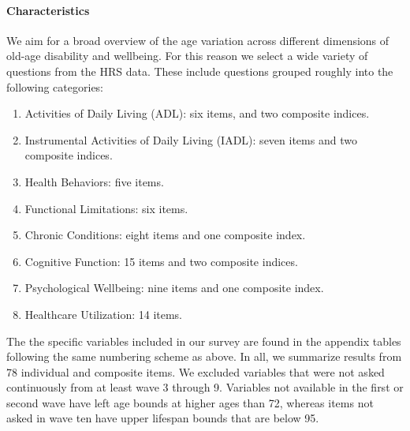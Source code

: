 \documentclass[11pt,oneside,a4paper]{article}
\begin{document}

\paragraph*{Characteristics}
We aim for a broad overview of the age variation across different dimensions of
old-age disability and wellbeing. For this reason we select a wide variety of
questions from the HRS data. These include questions
grouped roughly into the following categories: 

\begin{enumerate}
  \item Activities of Daily Living (ADL): six items, and two composite indices.
  \item Instrumental Activities of Daily Living (IADL): seven items and two
  composite indices.
  \item Health Behaviors: five items.
  \item Functional Limitations: six items.
  \item Chronic Conditions: eight items and one composite index.
  \item Cognitive Function: 15 items and two composite indices.
  \item Psychological Wellbeing: nine items and one composite index.
  \item Healthcare Utilization: 14 items.
\end{enumerate}

The the specific variables included in our survey are found in the appendix
tables following the same numbering scheme as above. In all, we summarize
results from 78 individual and composite items.
We excluded variables that were not asked continuously from at least wave 3 through 9. Variables not available in the
first or second wave have left age bounds at higher ages than 72, whereas items
not asked in wave ten have upper lifespan bounds that are below 95.
\end{document}
